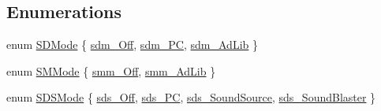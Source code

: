 \subsection*{Enumerations}
\begin{DoxyCompactItemize}
\item 
enum \hyperlink{ID__SD_8H_af66c128f54042fe02b7297e3e29a8b6d}{SDMode} \{ \hyperlink{ID__SD_8H_af66c128f54042fe02b7297e3e29a8b6da9e8d831f2f874c9c97cf5a114ebf2e3b}{sdm\_\-Off}, 
\hyperlink{ID__SD_8H_af66c128f54042fe02b7297e3e29a8b6daed42131277243677704a049738b4846f}{sdm\_\-PC}, 
\hyperlink{ID__SD_8H_af66c128f54042fe02b7297e3e29a8b6dadfbfbe4c2cdde81a3b8af8d46ed16d44}{sdm\_\-AdLib}
 \}
\item 
enum \hyperlink{ID__SD_8H_ac43ff64e0d1da85aa6fee6723a38a4de}{SMMode} \{ \hyperlink{ID__SD_8H_ac43ff64e0d1da85aa6fee6723a38a4deae4326ebdb5d97b82cf20df03ec06ad91}{smm\_\-Off}, 
\hyperlink{ID__SD_8H_ac43ff64e0d1da85aa6fee6723a38a4dea2eeb6820f0ebc5f8df241de89f9d2752}{smm\_\-AdLib}
 \}
\item 
enum \hyperlink{ID__SD_8H_a5d22d74f0369393939a5d3cf1dcfdaf3}{SDSMode} \{ \hyperlink{ID__SD_8H_a5d22d74f0369393939a5d3cf1dcfdaf3af396a40cb4e1c66fa91f8a1c4a9c09fd}{sds\_\-Off}, 
\hyperlink{ID__SD_8H_a5d22d74f0369393939a5d3cf1dcfdaf3a82ea57867b66b38a7e017992bf9970e6}{sds\_\-PC}, 
\hyperlink{ID__SD_8H_a5d22d74f0369393939a5d3cf1dcfdaf3a64ec9317ec8c2d07d939e59e767077f0}{sds\_\-SoundSource}, 
\hyperlink{ID__SD_8H_a5d22d74f0369393939a5d3cf1dcfdaf3aee0d176633ddbf54fb383642688bdb81}{sds\_\-SoundBlaster}
 \}
\end{DoxyCompactItemize}
